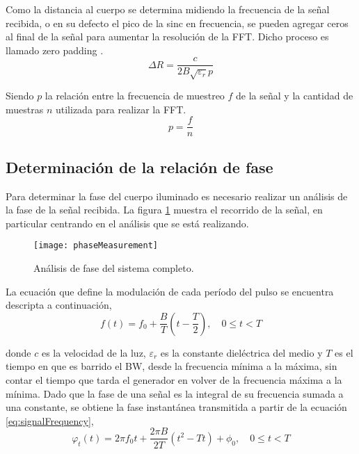 Como la distancia al cuerpo se determina midiendo la frecuencia de la señal recibida, o en su defecto el pico de la sinc en frecuencia, se pueden agregar ceros al final de la señal para aumentar la resolución de la FFT. Dicho proceso es llamado zero padding \cite{Oppenheim1990}.
\begin{equation}\label{eq:resolutionDistance2}
  \Delta R = \dfrac{c}{2B\sqrt{\varepsilon_r}p}
\end{equation}

Siendo $p$ la relación entre la frecuencia de muestreo $f$ de la señal y la cantidad de muestras $n$ utilizada para realizar la FFT.
\begin{equation}
  p = \frac{f}{n}
\end{equation}


\subsection{Determinación de la relación de fase}

Para determinar la fase del cuerpo iluminado es necesario realizar un análisis de la fase de la señal recibida. La figura \ref{fig:phaseSystem} muestra el recorrido de la señal, en particular centrando en el análisis que se está realizando.
\begin{figure}[htb]
 \centering
 \texttt{[image: phaseMeasurement]}
 \caption{Análisis de fase del sistema completo.}
 \label{fig:phaseSystem}
\end{figure}

La ecuación que define la modulación de cada período del pulso se encuentra descripta a continuación,
\begin{equation}
  f(t) = f_0 + \dfrac{B}{T}(t-\dfrac{T}{2}),\quad 0 \le t < T
  \label{eq:signalFrequency}
\end{equation}

donde $c$ es la velocidad de la luz, $\varepsilon_r$ es la constante dieléctrica del medio \cite{Brennan2014a} y $T$ es el tiempo en que es barrido el BW, desde la frecuencia mínima a la máxima, sin contar el tiempo que tarda el generador en volver de la frecuencia máxima a la mínima. Dado que la fase de una señal es la integral de su frecuencia sumada a una constante, se obtiene la fase instantánea transmitida a partir de la ecuación \ref{eq:signalFrequency},
\begin{equation}
  \varphi_t(t) = 2\pi f_0t + \dfrac{2\pi B}{2T}(t^2-Tt) + \phi_0,\quad 0 \le t < T
  \label{eq:signalFrequency2}
\end{equation}

